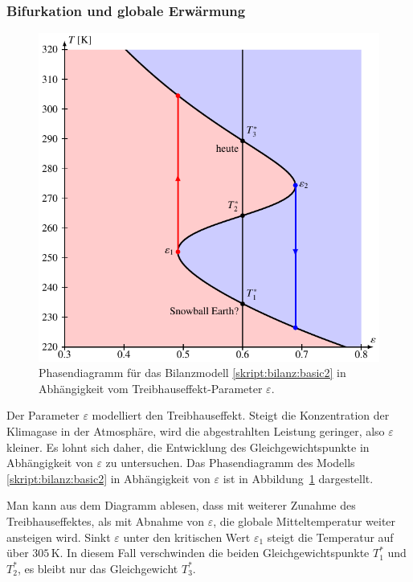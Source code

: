 \subsubsection{Bifurkation und globale Erwärmung}
\begin{figure}
\centering
\includegraphics{chapters/5/bifurkation.pdf}
\caption{Phasendiagramm für das Bilanzmodell
\eqref{skript:bilanz:basic2}
in Abhängigkeit vom Treibhauseffekt-Parameter $\varepsilon$.
\label{skript:bilanz:bifurkation}}
\end{figure}
Der Parameter $\varepsilon$ modelliert den Treibhauseffekt.
Steigt die Konzentration der Klimagase in der Atmosphäre, wird die
abgestrahlten Leistung geringer, also $\varepsilon$ kleiner.
Es lohnt sich daher, die Entwicklung des Gleichgewichtspunkte in 
Abhängigkeit von $\varepsilon$ zu untersuchen.
Das Phasendiagramm des Modells
\eqref{skript:bilanz:basic2} in Abhängigkeit von $\varepsilon$
ist in Abbildung~\ref{skript:bilanz:bifurkation} dargestellt.

Man kann aus dem Diagramm ablesen, dass mit weiterer Zunahme des 
Treibhauseffektes, als mit Abnahme von $\varepsilon$, die globale
Mitteltemperatur weiter ansteigen wird.
Sinkt $\varepsilon$ unter den kritischen Wert $\varepsilon_1$ steigt die
Temperatur auf über $305\,\text{K}$.
In diesem Fall verschwinden die beiden Gleichgewichtspunkte $T_1^*$
und $T_2^*$, es bleibt nur das Gleichgewicht $T_3^*$.

